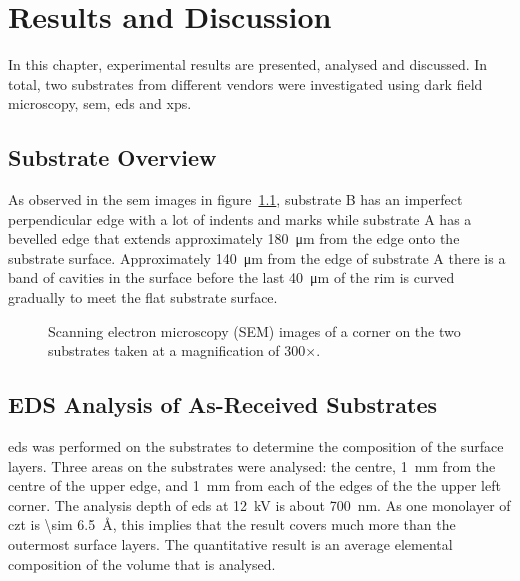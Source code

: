 \chapter{Results and Discussion}
In this chapter, experimental results are presented, analysed and discussed. In total, two substrates from different vendors were investigated using dark field microscopy, \ac{sem}, \ac{eds} and \ac{xps}.
\section{Substrate Overview}

As observed in the \ac{sem} images in figure~\ref{fig:SEM_corners}, substrate B has an imperfect perpendicular edge with a lot of indents and marks while substrate A has a bevelled edge that extends approximately \SI{180}{\micro\metre} from the edge onto the substrate surface. Approximately \SI{140}{\micro\metre} from the edge of substrate A there is a band of cavities in the surface before the last \SI{40}{\micro\metre} of the rim is curved gradually to meet the flat substrate surface.

\begin{figure}[htbp]
    \centering
    \quad
    \caption[SEM images of the corners on the substrates.]{Scanning electron microscopy (SEM) images of a corner on the two substrates taken at a magnification of 300$\times$.}
    \label{fig:SEM_corners}
\end{figure}


\section{EDS Analysis of As-Received Substrates}

\Ac{eds} was performed on the substrates to determine the composition of the surface layers. Three areas on the substrates were analysed: the centre, \SI{1}{\milli\metre} from the centre of the upper edge, and \SI{1}{\milli\metre} from each of the edges of the the upper left corner. The analysis depth of \ac{eds} at \SI{12}{\kilo\volt} is about \SI{700}{\nano\metre}. As one monolayer of \ac{czt} is \SI{\sim 6.5}{\angstrom}, this implies that the result covers much more than the outermost surface layers. The quantitative result is an average elemental composition of the volume that is analysed.

